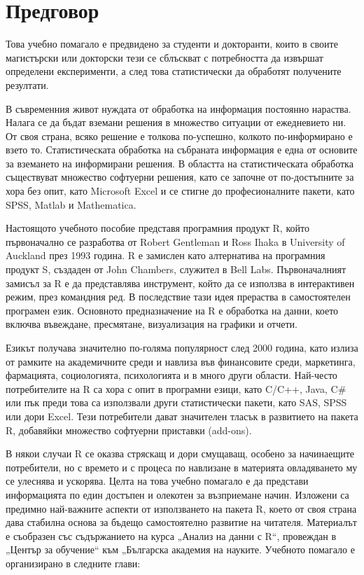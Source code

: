 ﻿\newpage
{}
\chapter*{Предговор}
\setcounter{page}{1}
\pagestyle{fancyplain}

Това учебно помагало е предвидено за студенти и докторанти, които в своите магистърски или докторски тези се сблъскват с потребността да извършат определени експерименти, а след това статистически да обработят получените резултати.

В съвременния живот нуждата от обработка на информация постоянно нараства. Налага се да бъдат вземани решения в множество ситуации от ежедневието ни. От своя страна, всяко решение е толкова по-успешно, колкото по-информирано е взето то. Статистическата обработка на събраната информация е една от основите за вземането на информирани решения. В областта на статистическата обработка съществуват множество софтуерни решения, като се започне от по-достъпните за хора без опит, като Microsoft Excel и се стигне до професионалните пакети, като SPSS, Matlab и Mathematica.

Настоящото учебното пособие представя програмния продукт R, който първоначално се разработва от Robert Gentleman и Ross Ihaka в University of Auckland през 1993 година. R е замислен като алтернатива на програмния продукт S, създаден от John Chambers, служител в Bell Labs. Първоначалният замисъл за R е да представлява инструмент, който да се използва в интерактивен режим, през командния ред. В последствие тази идея прераства в самостоятелен програмен език. Основното предназначение на R е обработка на данни, което включва въвеждане, пресмятане, визуализация на графики и отчети.

Езикът получава значително по-голяма популярност след 2000 година, като излиза от рамките на академичните среди и навлиза във финансовите среди, маркетинга, фармацията, социологията, психологията и в много други области. Най-често потребителите на R са хора с опит в програмни езици, като C/C++, Java, C\# или пък преди това са използвали други статистически пакети, като SAS, SPSS или дори Excel. Тези потребители дават значителен тласък в развитието на пакета R, добавяйки множество софтуерни приставки (add-ons).

В някои случаи R се оказва стряскащ и дори смущаващ, особено за начинаещите потребители, но с времето и с процеса по навлизане в материята овладяването му се улеснява и ускорява. Целта на това учебно помагало е да представи информацията по един достъпен и олекотен за възприемане начин. Изложени са предимно най-важните аспекти от използването на пакета R, което от своя страна дава стабилна основа за бъдещо самостоятелно развитие на читателя. Материалът е съобразен със съдържанието на курса „Анализ на данни с R“, провеждан в „Център за обучение“ към „Българска академия на науките. Учебното помагало е организирано в следните глави:

